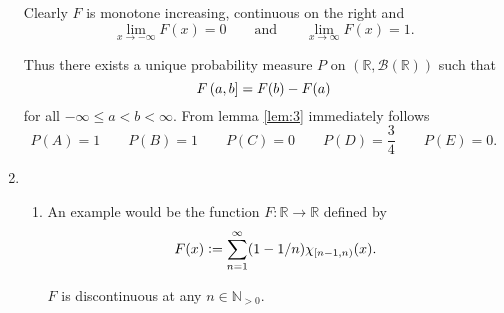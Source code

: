 \begin{enumerate}[label = \textbf{Exercise \arabic*.},wide = 0pt, itemsep=1.5ex]
		Clearly $F$ is monotone increasing, continuous on the right and
		\begin{equation}
			\lim_{x \to -\infty} F(x) = 0 \qquad \text{and} \qquad \lim_{x \to \infty} F(x) = 1.
		\end{equation}

		Thus there exists a unique probability measure $P$ on $(\mathbb{R},\mathcal{B}(\mathbb{R}))$ such that 
		\begin{equation}
			F\intoc{a,b} = F(b) - F(a)
		\end{equation}
		\noindent for all $-\infty \leq a < b < \infty$. From lemma \ref{lem:3} immediately follows
		\begin{equation*}
			P(A) = 1 \qquad  P(B) = 1 \qquad  P(C) = 0 \qquad  P(D) = \frac{3}{4} \qquad P(E) = 0.
		\end{equation*}
		
		\item
			~
			\begin{enumerate}[label = \arabic*.,wide = 0pt, itemsep=1.5ex]
				\item An example would be the function $F: \mathbb{R} \to \mathbb{R}$ defined by
					\begin{equation}
						F(x) := \sum_{n = 1}^\infty (1 - 1/n) \chi_{\intco{n-1,n}}(x).
					\end{equation}

					$F$ is discontinuous at any $n \in \mathbb{N}_{>0}$.
			\end{enumerate}

\end{enumerate}
\printbibliography

